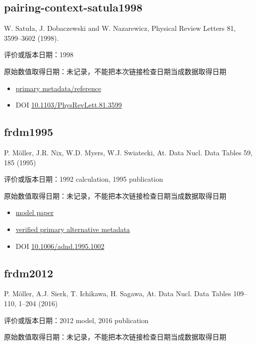 \documentclass[
  11pt,
  letterpaper,
]{article}
\providecommand{\tightlist}{%
  \setlength{\itemsep}{0pt}\setlength{\parskip}{0pt}}
\begin{document}
\subsection{pairing-context-satula1998}\label{pairing-context-satula1998}

W. Satuła, J. Dobaczewski and W. Nazarewicz, Physical Review Letters 81,
3599--3602 (1998).

评价或版本日期：1998

原始数值取得日期：未记录，不能把本次链接检查日期当成数据取得日期

\begin{itemize}
\tightlist
\item
  \href{https://journals.aps.org/prl/abstract/10.1103/PhysRevLett.81.3599}{primary
  metadata/reference}
\item
  DOI
  \href{https://doi.org/10.1103/PhysRevLett.81.3599}{10.1103/PhysRevLett.81.3599}
\end{itemize}

\subsection{frdm1995}\label{frdm1995}

P. Möller, J.R. Nix, W.D. Myers, W.J. Swiatecki, At. Data Nucl. Data
Tables 59, 185 (1995)

评价或版本日期：1992 calculation, 1995 publication

原始数值取得日期：未记录，不能把本次链接检查日期当成数据取得日期

\begin{itemize}
\tightlist
\item
  \href{https://doi.org/10.1006/adnd.1995.1002}{model paper}
\item
  \href{https://arxiv.org/abs/nucl-th/9308022}{verified primary
  alternative metadata}
\item
  DOI
  \href{https://doi.org/10.1006/adnd.1995.1002}{10.1006/adnd.1995.1002}
\end{itemize}

\subsection{frdm2012}\label{frdm2012}

P. Möller, A.J. Sierk, T. Ichikawa, H. Sagawa, At. Data Nucl. Data
Tables 109--110, 1--204 (2016)

评价或版本日期：2012 model, 2016 publication

原始数值取得日期：未记录，不能把本次链接检查日期当成数据取得日期
\end{document}
